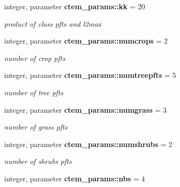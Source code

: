 \begin{DoxyCompactItemize}
\item 
\hypertarget{namespacectem__params_a4b2eab1c298364048680641681921e56}{}integer, parameter {\bfseries ctem\+\_\+params\+::kk} = 20\label{namespacectem__params_a4b2eab1c298364048680641681921e56}

\begin{DoxyCompactList}\small\item\em product of class pfts and l2max \end{DoxyCompactList}\item 
\hypertarget{namespacectem__params_a1da046f9e7bb1278e10a863dbfbda257}{}integer, parameter {\bfseries ctem\+\_\+params\+::numcrops} = 2\label{namespacectem__params_a1da046f9e7bb1278e10a863dbfbda257}

\begin{DoxyCompactList}\small\item\em number of crop pfts \end{DoxyCompactList}\item 
\hypertarget{namespacectem__params_a1bb0806116d93022aebdb7c5662a6375}{}integer, parameter {\bfseries ctem\+\_\+params\+::numtreepfts} = 5\label{namespacectem__params_a1bb0806116d93022aebdb7c5662a6375}

\begin{DoxyCompactList}\small\item\em number of tree pfts \end{DoxyCompactList}\item 
\hypertarget{namespacectem__params_aa48f481d72edc2d4d252c1fac748fabb}{}integer, parameter {\bfseries ctem\+\_\+params\+::numgrass} = 3\label{namespacectem__params_aa48f481d72edc2d4d252c1fac748fabb}

\begin{DoxyCompactList}\small\item\em number of grass pfts \end{DoxyCompactList}\item 
\hypertarget{namespacectem__params_a850eefc04333d2fa8736f5d43754b79f}{}integer, parameter {\bfseries ctem\+\_\+params\+::numshrubs} = 2\label{namespacectem__params_a850eefc04333d2fa8736f5d43754b79f}

\begin{DoxyCompactList}\small\item\em number of shrubs pfts \end{DoxyCompactList}\item 
\hypertarget{namespacectem__params_a1e8ba7b501ad6afcb7260b6b4711ae86}{}integer, parameter {\bfseries ctem\+\_\+params\+::nbs} = 4\label{namespacectem__params_a1e8ba7b501ad6afcb7260b6b4711ae86}


\end{DoxyCompactItemize}
